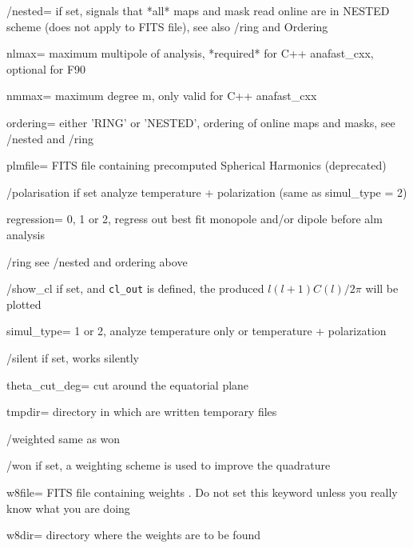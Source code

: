 \begin{keywords}
\begin{kwlist}{}
\item[/nested=] if set, signals that *all* maps and mask read online are in
   NESTED scheme (does not apply to FITS file), see also /ring and Ordering

\item[nlmax=]   maximum multipole of analysis, *required* for C++ anafast\_cxx,
      optional for F90 

\item[nmmax=]   maximum degree m, only valid for C++ anafast\_cxx 

\item[ordering=] either 'RING' or 'NESTED', ordering of online maps and masks,
 see /nested and /ring

\item[plmfile=] FITS file containing precomputed Spherical Harmonics (deprecated) 

\item[/polarisation] if set analyze temperature + polarization (same as simul\_type = 2)

\item[regression=] 0, 1 or 2, regress out best fit monopole and/or dipole before
    alm analysis

\item[/ring] see /nested and ordering above

\item[/show\_cl] if set, and {\tt cl\_out} is defined, the produced $l (l+1) C(l)/2\pi$ will
be plotted

\item[simul\_type=] 1 or 2, analyze temperature only or temperature + polarization

\item[/silent]    if set, works silently

\item[theta\_cut\_deg=] cut around the equatorial plane 

\item[tmpdir=]      directory in which are written temporary files 

\item[/weighted]     same as won

\item[/won]     if set, a weighting scheme is used to improve the quadrature

\item[w8file=]    FITS file containing weights 
     .
   Do not set this keyword unless you really know what you are doing

\item[w8dir=]     directory where the weights are to be found 

  \end{kwlist}
\end{keywords}  

